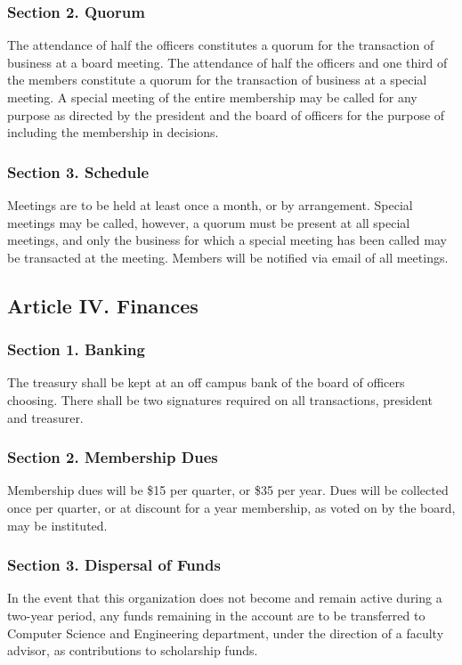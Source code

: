 \documentclass{article}
\begin{document}
    \subsubsection{Section 2. Quorum}
      The attendance of half the officers constitutes a quorum for the transaction of business at a board meeting. The attendance of half the officers and one third of the members constitute a quorum for the transaction of business at a special meeting. A special meeting of the entire membership may be called for any purpose as directed by the president and the board of officers for the purpose of including the membership in decisions.

    \subsubsection{Section 3. Schedule}
      Meetings are to be held at least once a month, or by arrangement. Special meetings may be called, however, a quorum must be present at all special meetings, and only the business for which a special meeting has been called may be transacted at the meeting. Members will be notified via email of all meetings.

  \subsection{Article IV. Finances}

    \subsubsection{Section 1. Banking}
      The treasury shall be kept at an off campus bank of the board of officers choosing. There shall be two signatures required on all transactions, president and treasurer.

    \subsubsection{Section 2. Membership Dues}
      Membership dues will be \$15 per quarter, or \$35 per year. Dues will be collected once per quarter, or at discount for a year membership, as voted on by the board, may be instituted.

    \subsubsection{Section 3. Dispersal of Funds}
      In the event that this organization does not become and remain active during a two-year period, any funds remaining in the account are to be transferred to Computer Science and Engineering department, under the direction of a faculty advisor, as contributions to scholarship funds.
\end{document}
